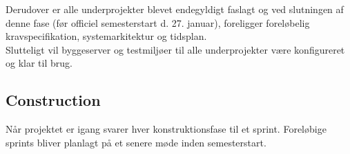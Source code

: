 Derudover er alle underprojekter blevet endegyldigt faslagt og ved slutningen af denne fase (før officiel semesterstart d. 27. januar), foreligger foreløbelig kravspecifikation, systemarkitektur og tidsplan. \\

Slutteligt vil byggeserver og testmiljøer til alle underprojekter være konfigureret og klar til brug.

\subsection{Construction}
Når projektet er igang svarer hver konstruktionsfase til et sprint. Foreløbige sprints bliver planlagt på et senere møde inden semesterstart.
